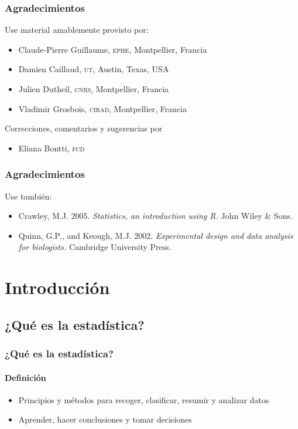 \documentclass[mathserif]{beamer}
\begin{document}
\begin{frame}[label=tnx1]
\frametitle{Agradecimientos}
Use material amablemente provisto por:
  \begin{itemize}
    \item Claude-Pierre Guillaume, \textsc{ephe}, Montpellier, Francia
    \item Damien Caillaud, \textsc{ut}, Austin, Texas, USA
    \item Julien Dutheil, \textsc{cnrs}, Montpellier, Francia
    \item Vladimir Grosbois, \textsc{cirad}, Montpellier, Francia
  \end{itemize}
  \medskip
Correcciones, comentarios y sugerencias por
  \begin{itemize}
     \item Eliana Bontti, \textsc{fcd}
  \end{itemize}
\end{frame}%

 
\begin{frame}[label=tnx2]
   \frametitle{Agradecimientos}
   Use tambi\'en:
    \begin{itemize}
      \item Crawley, M.J. 2005. \emph{Statistics, an introduction using R.} John Wiley \& Sons.
      \item Quinn, G.P., and Keough, M.J. 2002. \emph{Experimental design and data analysis for biologists.} Cambridge University Press. 
   \end{itemize}
\end{frame}%








\section{Introducci\'on}

\subsection[¿Qu\'e es?]{¿Qu\'e es la estad\'istica?}

\begin{frame}[label=def]
  \frametitle{¿Qu\'e es la estad\'istica?}
  \framesubtitle{Definici\'on}
  \begin{itemize}[<+-| handout:1>]
    \item Principios y m\'etodos para recoger, clasificar, resumir y analizar datos 
    \item Aprender, hacer conclusiones y tomar decisiones
  \end{itemize}
\end{frame}%
\end{document}
